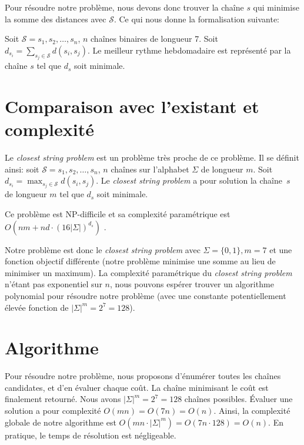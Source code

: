 \documentclass{roadef}
\def\S{\mathcal{S}}
\begin{document}
Pour résoudre notre problème, nous devons donc trouver la chaîne $s$
qui minimise la somme des distances avec $\S$. Ce qui nous donne la
formalisation suivante:

Soit $\S = s_1, s_2, \ldots, s_n$, $n$ chaînes binaires de
longueur 7. Soit
\begin{math}
  d_{s_i} = \sum_{s_j\in\S} d(s_i, s_j)
\end{math}.
Le meilleur rythme hebdomadaire est représenté par la chaîne $s$ tel
que $d_s$ soit minimale.

\section{Comparaison avec l'existant et complexité}

Le \emph{closest string problem} est un problème très proche de ce
problème.  Il se définit ainsi: soit $\S = s_1, s_2, \ldots, s_n$, $n$
chaînes sur l'alphabet $\Sigma$ de longueur $m$.  Soit $d_{s_i} =
\max_{s_j\in\S} d(s_i, s_j)$. Le \emph{closest string problem} a pour
solution la chaîne~$s$ de longueur $m$ tel que $d_s$ soit minimale.

Ce problème est NP-difficile \cite{lanctot2003distinguishing} et sa
complexité paramétrique est
\begin{math}
  O(nm + nd\cdot(16|\Sigma|)^{d_s})
\end{math}
\cite{ma2008more}.

Notre problème est donc le \emph{closest string problem} avec $\Sigma
= \{0, 1\}, m = 7$ et une fonction objectif différente (notre problème
minimise une somme au lieu de minimiser un maximum). La complexité
paramétrique du \emph{closest string problem} n'étant pas exponentiel
sur $n$, nous pouvons espérer trouver un algorithme polynomial pour
résoudre notre problème (avec une constante potentiellement élevée
fonction de $|\Sigma|^m = 2^7 = 128$).

\section{Algorithme}

Pour résoudre notre problème, nous proposons d'énumérer toutes les
chaînes candidates, et d'en évaluer chaque coût.  La chaîne minimisant
le coût est finalement retourné. Nous avons $|\Sigma|^m = 2^7 = 128$
chaînes possibles. Évaluer une solution a pour complexité $O(mn) =
O(7n) = O(n)$. Ainsi, la complexité globale de notre algorithme est
$O(mn\cdot|\Sigma|^m) = O(7n\cdot128) = O(n)$. En pratique, le temps
de résolution est négligeable.
\end{document}
